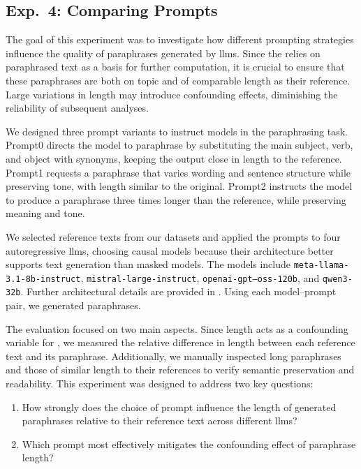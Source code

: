 \subsection{Exp.\ 4: Comparing Prompts}%
\label{subsec:prompt_impact}

The goal of this experiment was to investigate how different prompting strategies influence the quality of paraphrases generated by \acp{llm}.  
Since the \impAppr{} relies on paraphrased text as a basis for further computation, it is crucial to ensure that these paraphrases are both on topic and of comparable length as their reference.  
Large variations in length may introduce confounding effects, diminishing the reliability of subsequent analyses.

We designed three prompt variants to instruct models in the paraphrasing task.
Prompt0 directs the model to paraphrase by substituting the main subject, verb, and object with synonyms, keeping the output close in length to the reference.  
Prompt1 requests a paraphrase that varies wording and sentence structure while preserving tone, with length similar to the original.  
Prompt2 instructs the model to produce a paraphrase three times longer than the reference, while preserving meaning and tone. 

We selected reference texts from our datasets and applied the prompts to four autoregressive \acp{llm}, choosing causal models because their architecture better supports text generation than masked models. 
The models include \texttt{meta-llama-3.1-8b-instruct}, \texttt{mistral-large-instruct}, \texttt{openai-gpt--oss-120b}, and \texttt{qwen3-32b}.
Further architectural details are provided in . 
Using each model–prompt pair, we generated paraphrases.

The evaluation focused on two main aspects. 
Since length acts as a confounding variable for \imps{}, we measured the relative difference in length between each reference text and its paraphrase. 
Additionally, we manually inspected long paraphrases and those of similar length to their references to verify semantic preservation and readability.
This experiment was designed to address two key questions:
\begin{enumerate}
\item How strongly does the choice of prompt influence the length of generated paraphrases relative to their reference text across different \acp{llm}?
\item Which prompt most effectively mitigates the confounding effect of paraphrase length?
\end{enumerate}
